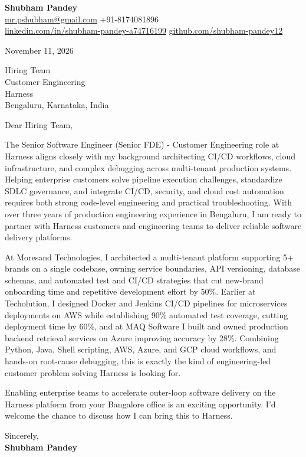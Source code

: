 \documentclass[a4paper,11pt]{article}
\begin{document}
\textbf{\Large Shubham Pandey}\\
\href{mailto:mr.pshubham@gmail.com}{mr.pshubham@gmail.com} \quad +91-8174081896\\
\href{https://www.linkedin.com/in/shubham-pandey-a74716199/}{linkedin.com/in/shubham-pandey-a74716199} \quad
\href{https://github.com/shubham-pandey12}{github.com/shubham-pandey12}

\vspace{1em}
November 11, 2026

\vspace{1em}
Hiring Team\\
Customer Engineering\\
Harness\\
Bengaluru, Karnataka, India

\vspace{1em}
Dear Hiring Team,

The Senior Software Engineer (Senior FDE) - Customer Engineering role at Harness aligns closely with my background architecting CI/CD workflows, cloud infrastructure, and complex debugging across multi-tenant production systems. Helping enterprise customers solve pipeline execution challenges, standardize SDLC governance, and integrate CI/CD, security, and cloud cost automation requires both strong code-level engineering and practical troubleshooting. With over three years of production engineering experience in Bengaluru, I am ready to partner with Harness customers and engineering teams to deliver reliable software delivery platforms.

At Moresand Technologies, I architected a multi-tenant platform supporting 5+ brands on a single codebase, owning service boundaries, API versioning, database schemas, and automated test and CI/CD strategies that cut new-brand onboarding time and repetitive development effort by 50\%. Earlier at Techolution, I designed Docker and Jenkins CI/CD pipelines for microservices deployments on AWS while establishing 90\% automated test coverage, cutting deployment time by 60\%, and at MAQ Software I built and owned production backend retrieval services on Azure improving accuracy by 28\%. Combining Python, Java, Shell scripting, AWS, Azure, and GCP cloud workflows, and hands-on root-cause debugging, this is exactly the kind of engineering-led customer problem solving Harness is looking for.

Enabling enterprise teams to accelerate outer-loop software delivery on the Harness platform from your Bangalore office is an exciting opportunity. I'd welcome the chance to discuss how I can bring this to Harness.

\vspace{1em}
Sincerely,\\[0.5em]
\textbf{Shubham Pandey}
\end{document}
